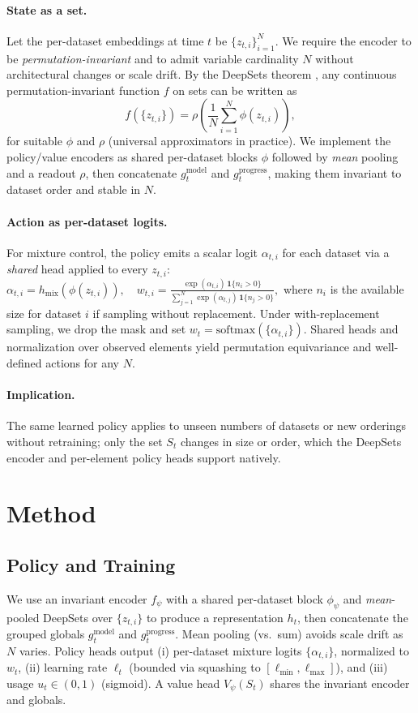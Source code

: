 \documentclass[11pt]{article}
\newcommand{\1}{\mathbf{1}}
\begin{document}
\paragraph{State as a set.}
Let the per-dataset embeddings at time $t$ be $\{z_{t,i}\}_{i=1}^N$.
We require the encoder to be \emph{permutation-invariant} and to admit variable cardinality $N$ without architectural changes or scale drift.
By the DeepSets theorem \citep{zaheer2017deepsets}, any continuous permutation-invariant function $f$ on sets can be written as
\begin{equation}
f(\{z_{t,i}\})=\rho\!\left(\frac{1}{N}\sum_{i=1}^N \phi(z_{t,i})\right),
\label{eq:deepsets}
\end{equation}
for suitable $\phi$ and $\rho$ (universal approximators in practice).
We implement the policy/value encoders as shared per-dataset blocks $\phi$ followed by \emph{mean} pooling and a readout $\rho$, then concatenate $g^{\text{model}}_t$ and $g^{\text{progress}}_t$, making them invariant to dataset order and stable in $N$.

\paragraph{Action as per-dataset logits.}
For mixture control, the policy emits a scalar logit $\alpha_{t,i}$ for each dataset via a \emph{shared} head applied to every $z_{t,i}$:
\(
\alpha_{t,i} = h_{\text{mix}}(\phi(z_{t,i})),\quad
w_{t,i}=\frac{\exp(\alpha_{t,i})\,\1\{n_i>0\}}{\sum_{j=1}^N \exp(\alpha_{t,j})\,\1\{n_j>0\}},
\)
where $n_i$ is the available size for dataset $i$ if sampling without replacement. Under with-replacement sampling,
we drop the mask and set $w_t=\mathrm{softmax}(\{\alpha_{t,i}\})$. Shared heads and normalization over observed elements yield permutation equivariance and well-defined actions for any $N$.

\paragraph{Implication.}
The same learned policy applies to unseen numbers of datasets or new orderings without retraining; only the set $S_t$ changes in size or order, which the DeepSets encoder and per-element policy heads support natively.

\section{Method}
\subsection{Policy and Training}
We use an invariant encoder $f_\psi$ with a shared per-dataset block $\phi_\psi$ and \emph{mean}-pooled DeepSets over $\{z_{t,i}\}$ to produce a representation $h_t$, then concatenate the grouped globals $g^{\text{model}}_t$ and $g^{\text{progress}}_t$. Mean pooling (vs.\ sum) avoids scale drift as $N$ varies.
Policy heads output (i) per-dataset mixture logits $\{\alpha_{t,i}\}$, normalized to $w_t$, (ii) learning rate $\ell_t$ (bounded via squashing to $[\ell_{\min},\ell_{\max}]$), and (iii) usage $u_t\in(0,1)$ (sigmoid).
A value head $V_\psi(S_t)$ shares the invariant encoder and globals.
\end{document}

